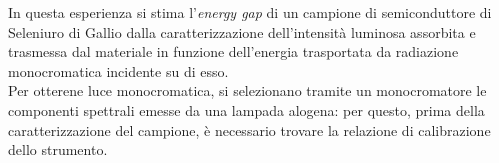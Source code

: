 In questa esperienza si stima l'\textit{energy gap} di un campione
di semiconduttore di Seleniuro di Gallio dalla caratterizzazione dell'intensità luminosa assorbita e trasmessa dal materiale in funzione dell'energia trasportata da radiazione monocromatica incidente su di esso.\\
Per otterene luce monocromatica, si selezionano tramite un monocromatore le componenti spettrali emesse da una lampada alogena: per questo, prima della caratterizzazione del campione, è necessario trovare la relazione di calibrazione dello strumento.